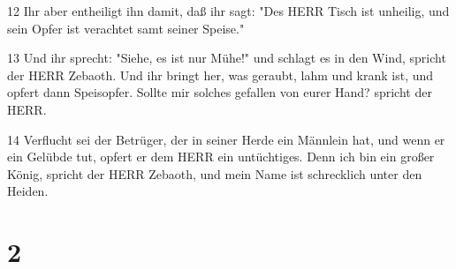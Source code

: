 \par 12 Ihr aber entheiligt ihn damit, daß ihr sagt: "Des HERR Tisch ist unheilig, und sein Opfer ist verachtet samt seiner Speise."
\par 13 Und ihr sprecht: "Siehe, es ist nur Mühe!" und schlagt es in den Wind, spricht der HERR Zebaoth. Und ihr bringt her, was geraubt, lahm und krank ist, und opfert dann Speisopfer. Sollte mir solches gefallen von eurer Hand? spricht der HERR.
\par 14 Verflucht sei der Betrüger, der in seiner Herde ein Männlein hat, und wenn er ein Gelübde tut, opfert er dem HERR ein untüchtiges. Denn ich bin ein großer König, spricht der HERR Zebaoth, und mein Name ist schrecklich unter den Heiden.

\chapter{2}

